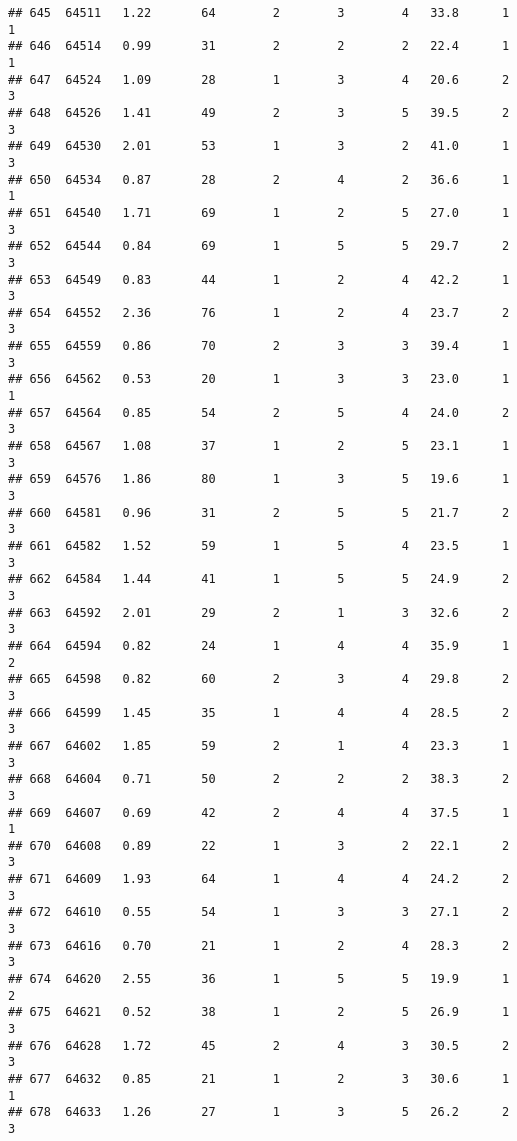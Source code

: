 \documentclass[
]{article}
\begin{document}
\begin{verbatim}
## 645  64511   1.22       64        2        3        4   33.8      1      1
## 646  64514   0.99       31        2        2        2   22.4      1      1
## 647  64524   1.09       28        1        3        4   20.6      2      3
## 648  64526   1.41       49        2        3        5   39.5      2      3
## 649  64530   2.01       53        1        3        2   41.0      1      3
## 650  64534   0.87       28        2        4        2   36.6      1      1
## 651  64540   1.71       69        1        2        5   27.0      1      3
## 652  64544   0.84       69        1        5        5   29.7      2      3
## 653  64549   0.83       44        1        2        4   42.2      1      3
## 654  64552   2.36       76        1        2        4   23.7      2      3
## 655  64559   0.86       70        2        3        3   39.4      1      3
## 656  64562   0.53       20        1        3        3   23.0      1      1
## 657  64564   0.85       54        2        5        4   24.0      2      3
## 658  64567   1.08       37        1        2        5   23.1      1      3
## 659  64576   1.86       80        1        3        5   19.6      1      3
## 660  64581   0.96       31        2        5        5   21.7      2      3
## 661  64582   1.52       59        1        5        4   23.5      1      3
## 662  64584   1.44       41        1        5        5   24.9      2      3
## 663  64592   2.01       29        2        1        3   32.6      2      3
## 664  64594   0.82       24        1        4        4   35.9      1      2
## 665  64598   0.82       60        2        3        4   29.8      2      3
## 666  64599   1.45       35        1        4        4   28.5      2      3
## 667  64602   1.85       59        2        1        4   23.3      1      3
## 668  64604   0.71       50        2        2        2   38.3      2      3
## 669  64607   0.69       42        2        4        4   37.5      1      1
## 670  64608   0.89       22        1        3        2   22.1      2      3
## 671  64609   1.93       64        1        4        4   24.2      2      3
## 672  64610   0.55       54        1        3        3   27.1      2      3
## 673  64616   0.70       21        1        2        4   28.3      2      3
## 674  64620   2.55       36        1        5        5   19.9      1      2
## 675  64621   0.52       38        1        2        5   26.9      1      3
## 676  64628   1.72       45        2        4        3   30.5      2      3
## 677  64632   0.85       21        1        2        3   30.6      1      1
## 678  64633   1.26       27        1        3        5   26.2      2      3

\end{verbatim}
\end{document}
